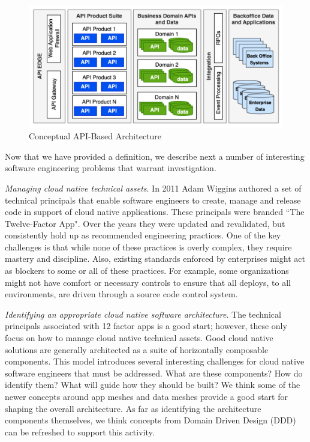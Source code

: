 \documentclass[conference]{IEEEtran}
\begin{document}
\begin{figure}[t]
	\includegraphics[width=\textwidth]{images/APIArchitecture.pdf}	
	\caption{Conceptual API-Based Architecture}
	\label{fig:APIArchitecture}
\end{figure}
Now that we have provided a definition, we describe next a number of interesting software engineering problems that warrant investigation.

\textit{Managing cloud native technical assets}.  In 2011 Adam Wiggins authored a set of technical principals that enable software engineers to create, manage and release code in support of cloud native applications. These principals were branded ``The Twelve-Factor App"\cite{12factor}.  Over the years they were updated and revalidated\cite{hoffman2016beyond, 12factorRevisited}, but consistently hold up as recommended engineering practices. One of the key challenges is that while none of these practices is overly complex, they require mastery and discipline. Also, existing standards enforced by enterprises might act as blockers to some or all of these practices.  For example, some organizations might not have comfort or necessary controls to ensure that all deploys, to all environments, are driven through a source code control system.

\textit{Identifying an appropriate cloud native software architecture}.  The technical principals associated with 12 factor apps is a good start; however, these only focus on how to manage cloud native technical assets.  Good cloud native solutions are generally architected as a suite of horizontally composable components. This model introduces several interesting challenges for cloud native software engineers that must be addressed. What are these components? How do identify them? What will guide how they should be built? We think some of the newer concepts around app meshes\cite{GartnerMASA} and data meshes\cite{datamesh} provide a good start for shaping the overall architecture.  As far as identifying the architecture components themselves, we think concepts from Domain Driven Design (DDD)\cite{evans2004domain, vernon2013implementing} can be refreshed to support this activity.
\end{document}
